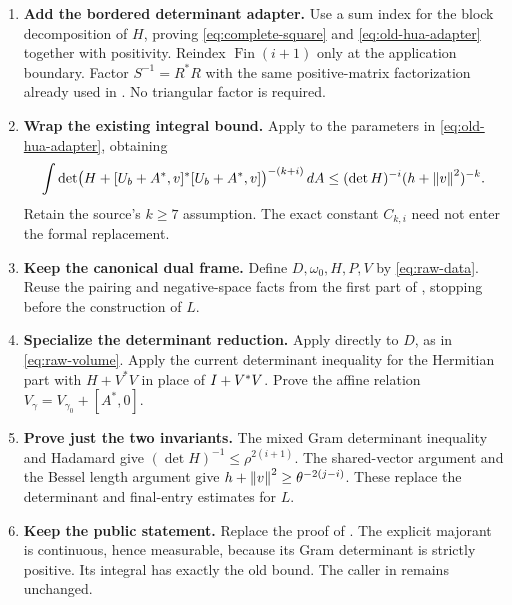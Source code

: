 \begin{enumerate}
\item \textbf{Add the bordered determinant adapter.}
Use a sum index for the block decomposition of \(H\), proving
\eqref{eq:complete-square} and \eqref{eq:old-hua-adapter} together with positivity.
Reindex \(\operatorname{Fin}(i+1)\) only at the application boundary.
Factor \(S^{-1}=R^*R\) with the same positive-matrix factorization already used
in . No triangular factor is required.

\item \textbf{Wrap the existing integral bound.}
Apply  to the parameters in
\eqref{eq:old-hua-adapter}, obtaining
\[
 \int \det\bigl(H+[U_b+A^*,v]^*[U_b+A^*,v]\bigr)^{-(k+i)}\,dA
 \leq(\det H)^{-i}(h+\left\lVert v\right\rVert^2)^{-k}.
\]
Retain the source's \(k\geq7\) assumption. The exact constant
\(C_{k,i}\) need not enter the formal replacement.

\item \textbf{Keep the canonical dual frame.}
Define \(D,\omega_0,H,P,V\) by \eqref{eq:raw-data}. Reuse the pairing and
negative-space facts from the first part of ,
stopping before the construction of \(L\).

\item \textbf{Specialize the determinant reduction.}
Apply  directly to \(D\), as in
\eqref{eq:raw-volume}. Apply the current determinant inequality for the
Hermitian part with \(H+V^*V\) in place of \(I+V^*V\).
Prove the affine relation \(V_\gamma=V_{\gamma_0}+[A^*,0]\).

\item \textbf{Prove just the two invariants.}
The mixed Gram determinant inequality and Hadamard give
\((\det H)^{-1}\leq\rho^{2(i+1)}\).
The shared-vector argument and the Bessel length argument give
\(h+\left\lVert v\right\rVert^2\geq\theta^{-2(j-i)}\).
These replace the determinant and final-entry estimates for \(L\).

\item \textbf{Keep the public statement.}
Replace the proof of .
The explicit majorant is continuous, hence measurable, because its Gram determinant
is strictly positive. Its integral has exactly the old bound.
The caller 
in  remains unchanged.
\end{enumerate}

